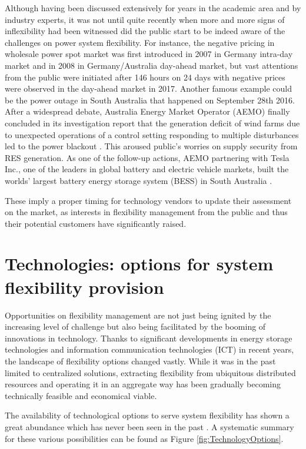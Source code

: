 Although having been discussed extensively for years in the academic area and by industry experts, it was not until quite recently when more and more signs of inflexibility had been witnessed did the public start to be indeed aware of the challenges on power system flexibility. For instance, the negative pricing in wholesale power spot market was first introduced in 2007 in Germany intra-day market and in 2008 in Germany/Australia day-ahead market\cite{EPEX_negative_price}, but vast attentions from the public were initiated after 146 hours on 24 days with negative prices were observed in the day-ahead market in 2017. Another famous example could be the power outage in South Australia that happened on September 28th 2016. After a widespread debate, Australia Energy Market Operator (AEMO) finally concluded in its investigation report that the generation deficit of wind farms due to unexpected operations of a control setting responding to multiple disturbances led to the power blackout  \cite{AEMO2016SA}.  This aroused public's worries on supply security from RES generation. As one of the follow-up actions, AEMO partnering with Tesla Inc., one of the leaders in global battery and electric vehicle markets,  built the worlds' largest battery energy storage system (BESS) in South Australia \cite{AEMO_tesla}.

These imply a proper timing for technology vendors to update their assessment on the market, as interests in flexibility management from the public and thus their potential customers have significantly raised.

\section{Technologies: options for system flexibility provision}

Opportunities on flexibility management are not just being ignited by the increasing level of challenge but also being facilitated by the booming of innovations in technology. Thanks to significant developments in energy storage technologies and information communication technologies (ICT) in recent years, the landscape of flexibility options changed vastly. While it was in the past limited to centralized solutions, extracting flexibility from ubiquitous distributed resources and operating it in an aggregate way has been gradually becoming technically feasible and economical viable.

The availability of technological options to serve system flexibility has shown a great abundance which has never been seen in the past \cite{Cochran2014,Wang2017,Lund2015,Muller2016}. A systematic summary for these various possibilities can be found as Figure \ref{fig:TechnologyOptions}.


